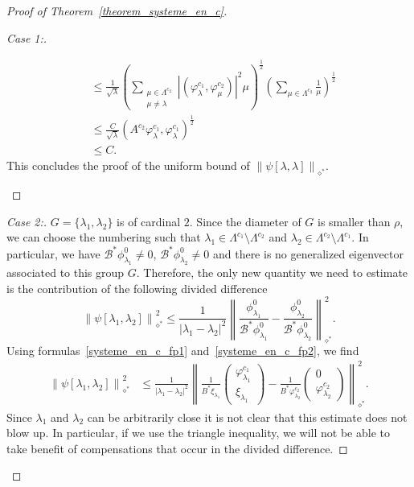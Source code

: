 \documentclass[10pt]{amsart}
\theoremstyle{definition}\newtheorem{defi}[theo]{Definition}\newtheorem{rema}[theo]{Remark}\newtheorem{exam}[theo]{Example}\newtheorem{exem}[theo]{Example}\newtheorem{nota}[theo]{Notation}
\newenvironment{step}[1]{\begin{proof}[#1]}{\let\qed\relax\end{proof}}
\newcommand{\fprop}[2]{\varphi^{#1}_{#2}}
\newcommand\Bs{\mathcal{B}^*}
\newcommand{\normeXalphas}[1]{\left\| #1 \right\|_{\diamond^*}}
\begin{document}
\begin{proof}[Proof of Theorem~\ref{theorem_systeme_en_c}]
\begin{step}{Case 1:}
\begin{itemize}
\begin{align*}
& \leq \frac{1}{\sqrt{\lambda}} \left(\sum_{\substack{\mu\in \Lambda^{c_2}\\ \mu \neq \lambda}} |(\fprop{c_1}{\lambda},\fprop{c_2}{\mu})|^2 \mu \right)^{\frac{1}{2}} \left(\sum_{\mu\in \Lambda^{c_2}} \frac{1}{\mu}\right)^{\frac{1}{2}} \\
& \leq \frac{C}{\sqrt{\lambda}} (A^{c_2}\fprop{c_1}{\lambda},\fprop{c_1}{\lambda})^{\frac{1}{2}} \\
& \leq C.
\end{align*}
This concludes the proof of the uniform bound of $\normeXalphas{\psi[\lambda,\lambda]}$.
\end{itemize}


\end{step}


\begin{step}{Case 2:}
$G=\{\lambda_1,\lambda_2\}$ is of cardinal $2$. Since the diameter of $G$ is smaller than $\rho$, we can choose the numbering such that $\lambda_1\in \Lambda^{c_1}\setminus \Lambda^{c_2}$ and $\lambda_2\in \Lambda^{c_2}\setminus\Lambda^{c_1}$. In particular, we have $\Bs \phi_{\lambda_1}^0\neq 0$, $\Bs\phi_{\lambda_2}^0 \neq 0$ and there is no generalized eigenvector associated to this group $G$. Therefore, the only new quantity we need to estimate is the contribution of the following divided difference
\[
\normeXalphas{\psi[\lambda_1,\lambda_2]}^2 \leq \frac{1}{|\lambda_1-\lambda_2|^2} \normeXalphas{\frac{\phi_{\lambda_1}^0}{\Bs \phi_{\lambda_1}^0} -\frac{\phi_{\lambda_2}^0}{\Bs \phi_{\lambda_2}^0} }^2.
\]
Using formulas~\eqref{systeme_en_c_fp1} and~\eqref{systeme_en_c_fp2}, we find
\begin{align*}
\normeXalphas{\psi[\lambda_1,\lambda_2]}^2 & \leq \frac{1}{|\lambda_1-\lambda_2|^2} \normeXalphas{ \frac{1}{B^* \xi_{\lambda_1}}
\begin{pmatrix} \fprop{c_1}{\lambda_1}\\ \xi_{\lambda_1}
\end{pmatrix} - \frac{1}{B^*\fprop{c_2}{\lambda_2}}
\begin{pmatrix} 0 \\ \fprop{c_2}{\lambda_2}
\end{pmatrix} }^2.
\end{align*}
Since $\lambda_1$ and $\lambda_2$ can be arbitrarily close it is not clear that this estimate does not blow up. In particular, if we use the triangle inequality, we will not be able to take benefit of compensations that occur in the divided difference.


\end{step}
\end{proof}
\end{document}
